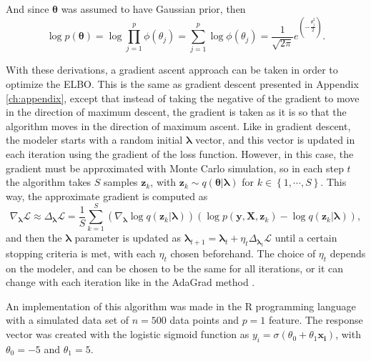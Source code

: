 And since $\boldsymbol{\theta}$ was assumed to have Gaussian prior, then
\begin{equation}
  \log p(\boldsymbol{\theta}) = \log \prod_{j = 1}^p \phi(\theta_j) = \sum_{j = 1}^p \log \phi(\theta_j) = \frac{1}{\sqrt{2 \pi}} e^{\left( -\frac{\theta_j^2}{2} \right)}.
\end{equation}

With these derivations, a gradient ascent approach can be taken in order to optimize the ELBO. This is the same as gradient descent presented in Appendix \ref{ch:appendix}, except that instead of taking the negative of the gradient to move in the direction of maximum descent, the gradient is taken as it is so that the algorithm moves in the direction of maximum ascent. Like in gradient descent, the modeler starts with a random initial $\boldsymbol{\lambda}$ vector, and this vector is updated in each iteration using the gradient of the loss function. However, in this case, the gradient must be approximated with Monte Carlo simulation, so in each step $t$ the algorithm takes $S$ samples $\boldsymbol{z}_k$, with $\boldsymbol{z}_k \sim q(\boldsymbol{\theta} | \boldsymbol{\lambda})$ for $k \in \left\{1, \cdots, S \right\}$. This way, the approximate gradient is computed as
\begin{equation}
  \nabla_{\boldsymbol{\lambda}} \mathcal{L} \approx \Delta_{\boldsymbol{\lambda}} \mathcal{L} = \frac{1}{S} \sum_{k = 1}^S \left( \nabla_{\boldsymbol{\lambda}} \log q(\boldsymbol{z}_k | \boldsymbol{\lambda}) \right) \left( \log p(\boldsymbol{y}, \boldsymbol{X}, \boldsymbol{z}_k) - \log q(\boldsymbol{z}_k | \boldsymbol{\lambda}) \right),
\end{equation}
and then the $\boldsymbol{\lambda}$ parameter is updated as $\boldsymbol{\lambda}_{t+1} = \boldsymbol{\lambda}_{t} + \eta_t  \Delta_{\boldsymbol{\lambda}_t} \mathcal{L}$ until a certain stopping criteria is met, with each $\eta_t$ chosen beforehand. The choice of $\eta_t$ depends on the modeler, and can be chosen to be the same for all iterations, or it can change with each iteration like in the AdaGrad method \cite{duchi2011adaptive}.

An implementation of this algorithm was made in the R programming language with a simulated data set of $n = 500$ data points and $p = 1$ feature. The response vector was created with the logistic sigmoid function as $y_i = \sigma(\theta_0 + \theta_1 \boldsymbol{x_i})$, with $\theta_0 = -5$ and $\theta_1 = 5$.

